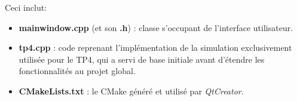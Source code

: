 Ceci inclut:
\begin{itemize}
    \item \textbf{mainwindow.cpp} (et son \textbf{.h}) : classe s'occupant de l'interface utilisateur.
    \item \textbf{tp4.cpp} : code reprenant l'implémentation de la simulation exclusivement utilisée pour le TP4, qui a servi de base initiale avant d'étendre les fonctionnalités au projet global.
    \item \textbf{CMakeLists.txt} : le CMake généré et utilisé par \textit{QtCreator}.
\end{itemize}
